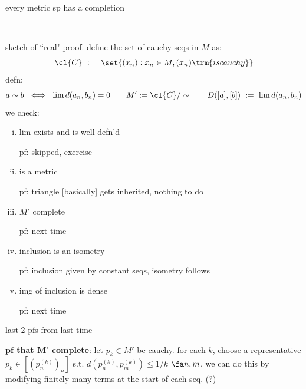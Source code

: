 \begin{thm}
    every metric sp has a completion
\end{thm} \

\begin{pf}[source=Primary Source Material]
    sketch of ``real" proof.
	define the set of cauchy seqs in $M$ as:
	\begin{equation*}
	    \cl{C} \ := \ \set{(x_{n}):x_{n}\in M, (x_{n}) \trm{ is cauchy}}
	\end{equation*}
	defn:
	\begin{equation*}
		a\sim b \ \iff \ \lim d(a_{n},b_{n})=0 \qquad
		M':=\cl{C}/\sim \qquad
		D([a],[b]) \ := \ \lim d(a_{n},b_{n})
	\end{equation*}
	we check:
	\begin{enumerate}[i)]
		\item lim exists and is well-defn'd

			pf: skipped, exercise
		\item is a metric

			pf: triangle [basically] gets inherited, nothing to do
		\item $M'$ complete

			pf: next time
		\item inclusion is an isometry

			pf: inclusion given by constant seqs, isometry follows
		\item img of inclusion is dense

			pf: next time
	\end{enumerate}
\end{pf}

last 2 pfs from last time

\textbf{pf that $\bm{M'}$ complete}:
let $p_{k}\in M'$ be cauchy.
for each $k$, choose a representative $p_{k}\in[(p_{n}^{(k)})_{n}]$
s.t. $d(p_{n}^{(k)},p_{m}^{(k)})\leq1/k$ $\fa n,m$.
we can do this by modifying finitely many terms at the start of each seq. (?)

